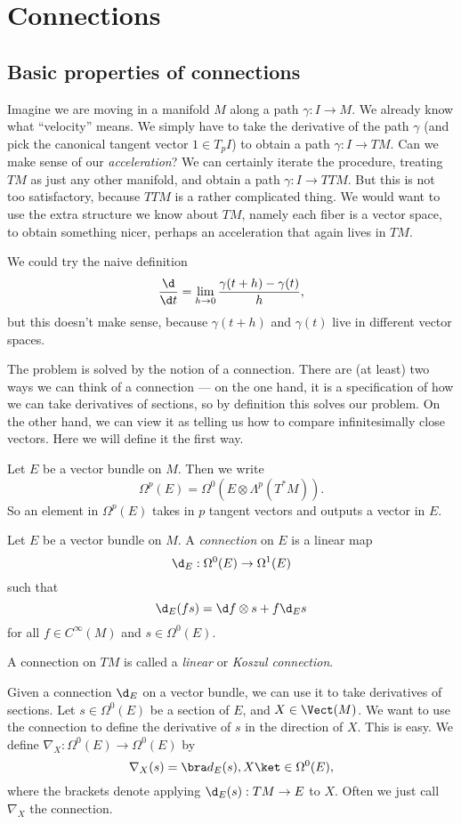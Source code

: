 \documentclass[a4paper]{article}
\begin{document}
\section{Connections}
\subsection{Basic properties of connections}
Imagine we are moving in a manifold $M$ along a path $\gamma: I \to M$. We already know what ``velocity'' means. We simply have to take the derivative of the path $\gamma$ (and pick the canonical tangent vector $1 \in T_p I$) to obtain a path $\gamma: I \to TM$. Can we make sense of our \emph{acceleration}? We can certainly iterate the procedure, treating $TM$ as just any other manifold, and obtain a path $\gamma: I \to TTM$. But this is not too satisfactory, because $TTM$ is a rather complicated thing. We would want to use the extra structure we know about $TM$, namely each fiber is a vector space, to obtain something nicer, perhaps an acceleration that again lives in $TM$.

We could try the naive definition
\[
  \frac{\d}{\d t} = \lim_{h \to 0} \frac{\gamma(t + h) - \gamma(t)}{h},
\]
but this doesn't make sense, because $\gamma(t + h)$ and $\gamma(t)$ live in different vector spaces. %

The problem is solved by the notion of a connection. There are (at least) two ways we can think of a connection --- on the one hand, it is a specification of how we can take derivatives of sections, so by definition this solves our problem. On the other hand, we can view it as telling us how to compare infinitesimally close vectors. Here we will define it the first way.

\begin{notation}
  Let $E$ be a vector bundle on $M$. Then we write
  \[
    \Omega^p(E) = \Omega^0(E \otimes \Lambda^p (T^* M)).
  \]
  So an element in $\Omega^p(E)$ takes in $p$ tangent vectors and outputs a vector in $E$.
\end{notation}

\begin{defi}[Connection]
  Let $E$ be a vector bundle on $M$. A \emph{connection} on $E$ is a linear map
  \[
    \d_E: \Omega^0(E) \to \Omega^1(E)
  \]
  such that
  \[
    \d_E (fs) = \d f \otimes s + f \d_E s
  \]
  for all $f \in C^\infty(M)$ and $s \in \Omega^0(E)$.

  A connection on $TM$ is called a \emph{linear} or \emph{Koszul connection}.
\end{defi}
Given a connection $\d_E$ on a vector bundle, we can use it to take derivatives of sections. Let $s \in \Omega^0(E)$ be a section of $E$, and $X \in \Vect(M)$. We want to use the connection to define the derivative of $s$ in the direction of $X$. This is easy. We define $\nabla_X: \Omega^0(E) \to \Omega^0(E)$ by
\[
  \nabla_X(s) = \bra d_E(s), X \ket \in \Omega^0(E),
\]
where the brackets denote applying $\d_E(s): TM \to E$ to $X$. Often we just call $\nabla_X$ the connection.
\end{document}
